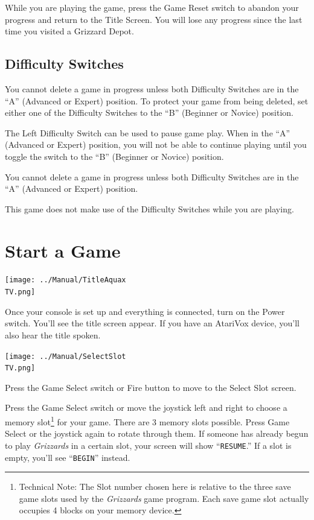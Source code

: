 \documentclass[10pt,twocolumn,openany,article]{memoir}
\newcommand\TV{NTSC}
\newcommand\TV{PAL}
\newcommand\TV{SECAM}
\begin{document}
While you are  playing the game, press the Game  Reset switch to abandon
your progress and return to the Title Screen. You will lose any progress
since the last time you visited a Grizzard Depot.

\subsection{Difficulty Switches}

You cannot delete a game in progress unless both Difficulty Switches are
in the  ``A'' (Advanced or Expert)  position. To protect your  game from
being deleted,  set either one of  the Difficulty Switches to  the ``B''
(Beginner or Novice) position.

\ifdefined\TVSECAM

The Left Difficulty Switch  can be used to pause game  play. When in the
``A'' (Advanced  or Expert) position, you  will not be able  to continue
playing  until  you  toggle  the   switch  to  the  ``B''  (Beginner  or
Novice) position.

You cannot delete a game in progress unless both Difficulty Switches are
in the ``A'' (Advanced or Expert) position.

\else

This  game does  not  make  use of  the  Difficulty  Switches while  you
are playing. 

\fi

\section{Start a Game}

\begin{center}
  \texttt{[image: ../Manual/TitleAquax\\TV.png]}
\end{center}

Once your  console is set  up and everything  is connected, turn  on the
Power  switch. You'll  see  the  title screen  appear.  If  you have  an
AtariVox device, you'll also hear the title spoken.


\begin{center}
  \texttt{[image: ../Manual/SelectSlot\\TV.png]}
\end{center}

Press  the Game  Select switch  or  Fire button  to move  to the  Select
Slot screen.

Press the  Game Select  switch or  move the joystick  left and  right to
choose  a memory  slot\footnote{Technical Note:  The Slot  number chosen
  here  is  relative   to  the  three  save  game  slots   used  by  the
  \textit{Grizzards} game program. Each save game slot actually occupies
  4 blocks  on your memory  device.} for your  game. There are  3 memory
slots  possible. Press  Game  Select  or the  joystick  again to  rotate
through them. If someone has already begun to play \textit{Grizzards} in
a certain slot, your screen will  show ``\texttt{RESUME}.'' If a slot is
empty, you'll see ``\texttt{BEGIN}'' instead.
\end{document}
